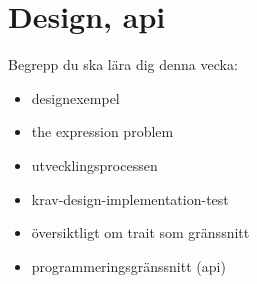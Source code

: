 \chapter{Design, api}\label{chapter:W13}
Begrepp du ska lära dig denna vecka:
\begin{itemize}[noitemsep,label={$\square$},leftmargin=*]
\item designexempel
\item the expression problem
\item utvecklingsprocessen
\item krav-design-implementation-test
\item översiktligt om trait som gränssnitt
\item programmeringsgränssnitt (api)\end{itemize}
